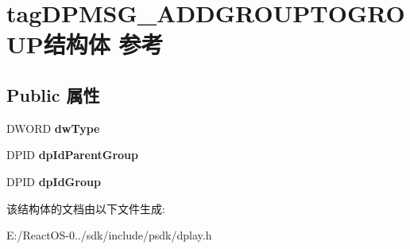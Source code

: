 \hypertarget{structtag_d_p_m_s_g___a_d_d_g_r_o_u_p_t_o_g_r_o_u_p}{}\section{tag\+D\+P\+M\+S\+G\+\_\+\+A\+D\+D\+G\+R\+O\+U\+P\+T\+O\+G\+R\+O\+U\+P结构体 参考}
\label{structtag_d_p_m_s_g___a_d_d_g_r_o_u_p_t_o_g_r_o_u_p}
\subsection*{Public 属性}
\begin{DoxyCompactItemize}
\item 
\mbox{\label{structtag_d_p_m_s_g___a_d_d_g_r_o_u_p_t_o_g_r_o_u_p_a6a70780667c6366ffda2a6bf35fbfe1e}} 
D\+W\+O\+RD {\bfseries dw\+Type}
\item 
\mbox{\label{structtag_d_p_m_s_g___a_d_d_g_r_o_u_p_t_o_g_r_o_u_p_ad13251ed0ebd3f47a55bee227a06a76e}} 
D\+P\+ID {\bfseries dp\+Id\+Parent\+Group}
\item 
\mbox{\label{structtag_d_p_m_s_g___a_d_d_g_r_o_u_p_t_o_g_r_o_u_p_a2c402045be16c018fb05d439ec1dae28}} 
D\+P\+ID {\bfseries dp\+Id\+Group}
\end{DoxyCompactItemize}


该结构体的文档由以下文件生成\+:\begin{DoxyCompactItemize}
\item 
E\+:/\+React\+O\+S-\/0../sdk/include/psdk/dplay.\+h\end{DoxyCompactItemize}
